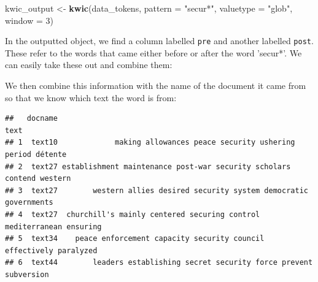 \documentclass[
]{book}
\newenvironment{Shaded}{\begin{snugshade}}{\end{snugshade}}
\newcommand{\AttributeTok}[1]{\textcolor[rgb]{0.13,0.29,0.53}{#1}}
\newcommand{\DecValTok}[1]{\textcolor[rgb]{0.00,0.00,0.81}{#1}}
\newcommand{\FunctionTok}[1]{\textcolor[rgb]{0.13,0.29,0.53}{\textbf{#1}}}
\newcommand{\NormalTok}[1]{#1}
\newcommand{\OtherTok}[1]{\textcolor[rgb]{0.56,0.35,0.01}{#1}}
\newcommand{\SpecialCharTok}[1]{\textcolor[rgb]{0.81,0.36,0.00}{\textbf{#1}}}
\newcommand{\StringTok}[1]{\textcolor[rgb]{0.31,0.60,0.02}{#1}}
\begin{document}
\begin{Shaded}
\begin{Highlighting}[]
\NormalTok{kwic\_output }\OtherTok{\textless{}{-}} \FunctionTok{kwic}\NormalTok{(data\_tokens, }\AttributeTok{pattern =} \StringTok{"secur*"}\NormalTok{, }\AttributeTok{valuetype =} \StringTok{"glob"}\NormalTok{, }\AttributeTok{window =} \DecValTok{3}\NormalTok{)}
\end{Highlighting}
\end{Shaded}

In the outputted object, we find a column labelled \texttt{pre} and another labelled \texttt{post}. These refer to the words that came either before or after the word 'secur*'. We can easily take these out and combine them:

\begin{Shaded}
\end{Shaded}

We then combine this information with the name of the document it came from so that we know which text the word is from:

\begin{Shaded}
\end{Shaded}

\begin{verbatim}
##   docname                                                                 text
## 1  text10             making allowances peace security ushering period détente
## 2  text27 establishment maintenance post-war security scholars contend western
## 3  text27        western allies desired security system democratic governments
## 4  text27  churchill's mainly centered securing control mediterranean ensuring
## 5  text34    peace enforcement capacity security council effectively paralyzed
## 6  text44        leaders establishing secret security force prevent subversion
\end{verbatim}
\end{document}
